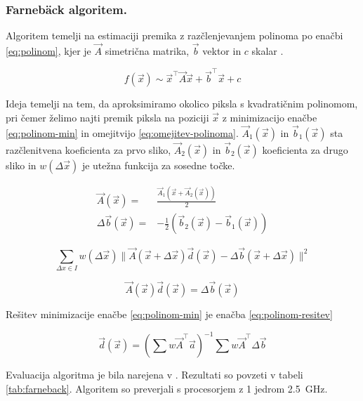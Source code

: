 \subsubsection{Farneb{\"a}ck algoritem.}
Algoritem temelji na estimaciji premika z razčlenjevanjem polinoma  po enačbi \eqref{eq:polinom}, kjer je $\vec{A}$ simetrična matrika, $\vec{b}$ vektor in $c$ skalar \cite{farneback2003two}.

\begin{equation}\label{eq:polinom}
	f(\vec{x}) \sim \vec{x}^\top \vec{A} \vec{x} + \vec{b}^\top \vec{x} + c
\end{equation}

Ideja temelji na tem, da aproksimiramo okolico piksla s kvadratičnim polinomom, pri čemer želimo najti premik piksla na poziciji $\vec{x}$ z minimizacijo enačbe \eqref{eq:polinom-min} in omejitvijo \eqref{eq:omejitev-polinoma}. $\vec{A}_1(\vec{x})$ in $\vec{b}_1(\vec{x})$ sta razčlenitvena koeficienta za prvo sliko, $\vec{A}_2(\vec{x})$ in $\vec{b}_2(\vec{x})$ koeficienta za drugo sliko in $w(\Delta\vec{x})$ je utežna funkcija za sosedne točke.

\begin{align}
\vec{A}(\vec{x}) = & \frac{\vec{A}_1(\vec{x} + \vec{A}_2(\vec{x}))}{2} \\
\Delta\vec{b}(\vec{x}) = & - \frac{1}{2}\left(\vec{b}_2(\vec{x}) - \vec{b}_1(\vec{x})\right) 
\end{align}

\begin{equation}\label{eq:polinom-min}
\sum_{\Delta x \in I} w(\Delta\vec{x}) \| \vec{A}(\vec{x} + \Delta\vec{x})\vec{d}(\vec{x}) - \Delta\vec{b}(\vec{x} +\Delta\vec{x}) \|^2
\end{equation}

\begin{equation}\label{eq:omejitev-polinoma}
\vec{A}(\vec{x})\vec{d}(\vec{x}) = \Delta\vec{b}(\vec{x})
\end{equation}

Rešitev minimizacije enačbe \eqref{eq:polinom-min} je enačba \eqref{eq:polinom-resitev}

\begin{equation}\label{eq:polinom-resitev}
 \vec{d}(\vec{x}) = \left( \sum w \vec{A}^\top \vec{a} \right)^{-1} \sum w \vec{A}^\top \Delta\vec{b}
\end{equation}

Evaluacija algoritma je bila narejena v \cite{Geiger2012CVPR}. Rezultati so povzeti v tabeli \ref{tab:farneback}. Algoritem so preverjali s procesorjem z 1 jedrom \@ \SI{2.5}{GHz}.

